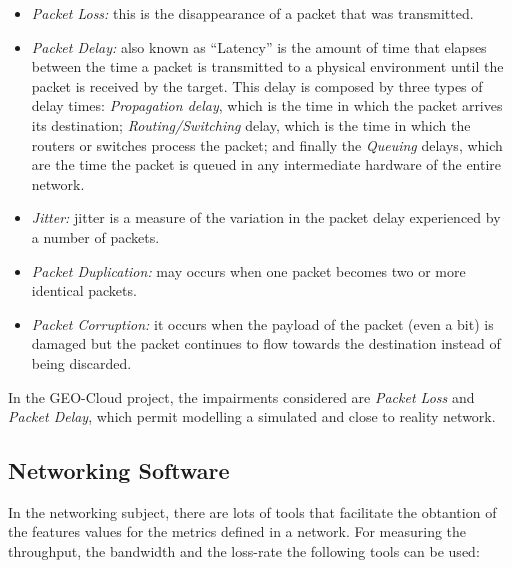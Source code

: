 \begin{itemize}
\item \emph{Packet Loss:} this is the disappearance of a packet that was
  transmitted.
\item \emph{Packet Delay:} also known as ``Latency'' is the amount of time that elapses between the time a
  packet is transmitted to a physical environment until the packet is received by
  the target. This delay is composed by three types of delay times: \emph{Propagation
  delay}, which is the time in which the packet arrives its destination;
  \emph{Routing/Switching} delay, which is the time in which the routers or
  switches  process the packet; and finally the \emph{Queuing} delays, which are
  the time the packet is queued in any intermediate hardware of the entire network.
\item \emph{Jitter:} jitter is a measure of the variation in the packet delay
  experienced by a number of packets.
\item \emph{Packet Duplication:} may occurs when one packet becomes two or more
  identical packets.
\item \emph{Packet Corruption:} it occurs when the payload of the packet (even a bit)
  is damaged but the packet continues to flow towards the destination instead of
  being discarded.
\end{itemize}

In the GEO-Cloud project, the impairments considered are \emph{Packet Loss} and
\emph{Packet Delay}, which permit modelling a simulated and close to reality network.


\subsection{Networking Software}

In the networking subject, there are lots of tools that facilitate the obtantion
of the
features values for the metrics defined in a network.
For measuring the throughput, the bandwidth and the loss-rate the following
tools can be used:

